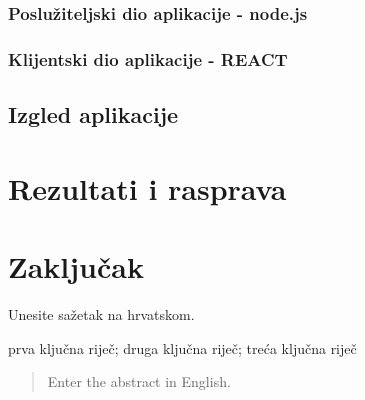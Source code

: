 \documentclass[zavrsnirad]{fer}
\begin{document}
\subsection{Poslužiteljski dio aplikacije - node.js}

\subsection{Klijentski dio aplikacije - REACT}
\label{sec:frontend}

\section{Izgled aplikacije}


\chapter{Rezultati i rasprava}
\label{pog:rezultati_i_rasprava}


\chapter{Zaključak}
\label{pog:zakljucak}




\nocite{*}




\begin{sazetak}
  Unesite sažetak na hrvatskom.

  \blindtext
\end{sazetak}

\begin{kljucnerijeci}
  prva ključna riječ; druga ključna riječ; treća ključna riječ
\end{kljucnerijeci}


\begin{abstract}
  Enter the abstract in English.
  
  \blindtext 
\end{abstract}
\end{document}
